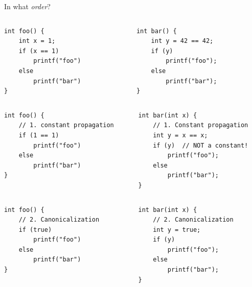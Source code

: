 \documentclass[8pt]{beamer}
\begin{document}
\begin{frame}[fragile]{In what \emph{order}?}
\begin{columns}[T] %
\begin{column}{.48\textwidth}
\begin{verbatim}
int foo() {
    int x = 1;
    if (x == 1)
        printf("foo")
    else
        printf("bar")
}
\end{verbatim}
\end{column}

\begin{column}{.48\textwidth}
\begin{verbatim}
int bar() {
    int y = 42 == 42;
    if (y)
        printf("foo");
    else
        printf("bar");
}
\end{verbatim}
\end{column}
\end{columns}
\pause


\begin{columns}[T] %
\begin{column}{.48\textwidth}
\begin{verbatim}
int foo() {
    // 1. constant propagation
    if (1 == 1)
        printf("foo")
    else
        printf("bar")
}
\end{verbatim}
\end{column}
\begin{column}{.48\textwidth}
\begin{verbatim}
int bar(int x) {
    // 1. Constant propagation
    int y = x == x;
    if (y)  // NOT a constant!
        printf("foo");
    else
        printf("bar");
}
\end{verbatim}
\end{column}
\end{columns}
\pause


\begin{columns}
\begin{column}{.48\textwidth}
\begin{verbatim}
int foo() {
    // 2. Canonicalization
    if (true)
        printf("foo")
    else
        printf("bar")
}
\end{verbatim}
\end{column}
\begin{column}{.48\textwidth}
\begin{verbatim}
int bar(int x) {
    // 2. Canonicalization
    int y = true;
    if (y)  
        printf("foo");
    else
        printf("bar");
}
\end{verbatim}
\end{column}
\end{columns}


\end{frame}
\end{document}
